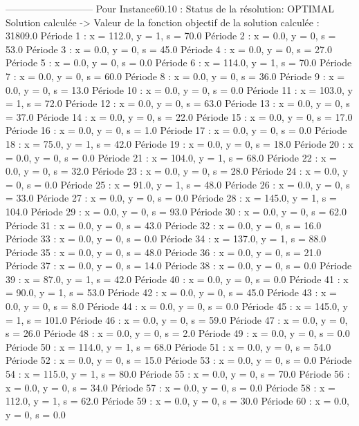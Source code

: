---------------------------
Pour Instance60.10 :
Status de la résolution: OPTIMAL
Solution calculée
-> Valeur de la fonction objectif de la solution calculée :  31809.0
Période 1 : x = 112.0, y = 1, s = 70.0
Période 2 : x = 0.0, y = 0, s = 53.0
Période 3 : x = 0.0, y = 0, s = 45.0
Période 4 : x = 0.0, y = 0, s = 27.0
Période 5 : x = 0.0, y = 0, s = 0.0
Période 6 : x = 114.0, y = 1, s = 70.0
Période 7 : x = 0.0, y = 0, s = 60.0
Période 8 : x = 0.0, y = 0, s = 36.0
Période 9 : x = 0.0, y = 0, s = 13.0
Période 10 : x = 0.0, y = 0, s = 0.0
Période 11 : x = 103.0, y = 1, s = 72.0
Période 12 : x = 0.0, y = 0, s = 63.0
Période 13 : x = 0.0, y = 0, s = 37.0
Période 14 : x = 0.0, y = 0, s = 22.0
Période 15 : x = 0.0, y = 0, s = 17.0
Période 16 : x = 0.0, y = 0, s = 1.0
Période 17 : x = 0.0, y = 0, s = 0.0
Période 18 : x = 75.0, y = 1, s = 42.0
Période 19 : x = 0.0, y = 0, s = 18.0
Période 20 : x = 0.0, y = 0, s = 0.0
Période 21 : x = 104.0, y = 1, s = 68.0
Période 22 : x = 0.0, y = 0, s = 32.0
Période 23 : x = 0.0, y = 0, s = 28.0
Période 24 : x = 0.0, y = 0, s = 0.0
Période 25 : x = 91.0, y = 1, s = 48.0
Période 26 : x = 0.0, y = 0, s = 33.0
Période 27 : x = 0.0, y = 0, s = 0.0
Période 28 : x = 145.0, y = 1, s = 104.0
Période 29 : x = 0.0, y = 0, s = 93.0
Période 30 : x = 0.0, y = 0, s = 62.0
Période 31 : x = 0.0, y = 0, s = 43.0
Période 32 : x = 0.0, y = 0, s = 16.0
Période 33 : x = 0.0, y = 0, s = 0.0
Période 34 : x = 137.0, y = 1, s = 88.0
Période 35 : x = 0.0, y = 0, s = 48.0
Période 36 : x = 0.0, y = 0, s = 21.0
Période 37 : x = 0.0, y = 0, s = 14.0
Période 38 : x = 0.0, y = 0, s = 0.0
Période 39 : x = 87.0, y = 1, s = 42.0
Période 40 : x = 0.0, y = 0, s = 0.0
Période 41 : x = 90.0, y = 1, s = 53.0
Période 42 : x = 0.0, y = 0, s = 45.0
Période 43 : x = 0.0, y = 0, s = 8.0
Période 44 : x = 0.0, y = 0, s = 0.0
Période 45 : x = 145.0, y = 1, s = 101.0
Période 46 : x = 0.0, y = 0, s = 59.0
Période 47 : x = 0.0, y = 0, s = 26.0
Période 48 : x = 0.0, y = 0, s = 2.0
Période 49 : x = 0.0, y = 0, s = 0.0
Période 50 : x = 114.0, y = 1, s = 68.0
Période 51 : x = 0.0, y = 0, s = 54.0
Période 52 : x = 0.0, y = 0, s = 15.0
Période 53 : x = 0.0, y = 0, s = 0.0
Période 54 : x = 115.0, y = 1, s = 80.0
Période 55 : x = 0.0, y = 0, s = 70.0
Période 56 : x = 0.0, y = 0, s = 34.0
Période 57 : x = 0.0, y = 0, s = 0.0
Période 58 : x = 112.0, y = 1, s = 62.0
Période 59 : x = 0.0, y = 0, s = 30.0
Période 60 : x = 0.0, y = 0, s = 0.0



